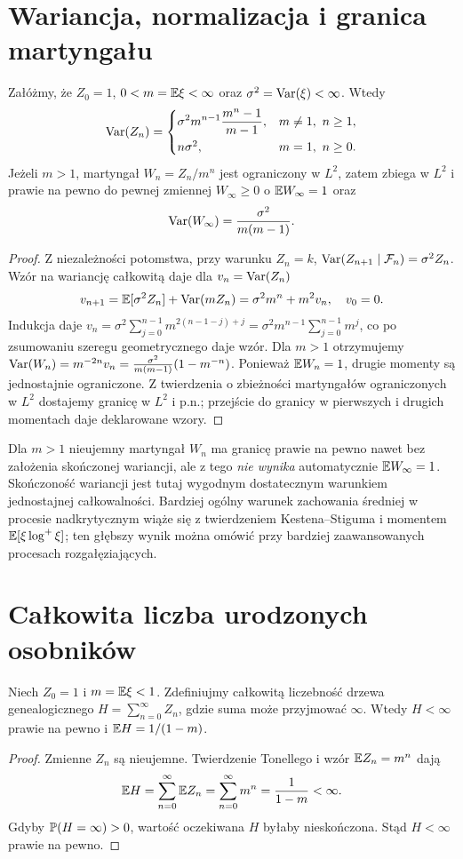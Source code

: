 \section{Wariancja, normalizacja i granica martyngału}
\begin{twierdzenie}
Załóżmy, że $Z_0=1$, $0<m=\mathbb{E}\xi<\infty$ oraz
$\sigma^2=\operatorname{Var}(\xi)<\infty$. Wtedy
\[
\Var(Z_n)=
\begin{cases}
\displaystyle \sigma^2m^{n-1}\frac{m^n-1}{m-1},&m\ne1,\ n\ge1,\\[6pt]
 n\sigma^2,&m=1,\ n\ge0.
\end{cases}
\]
Jeżeli $m>1$, martyngał $W_n=Z_n/m^n$ jest ograniczony
w $L^2$, zatem zbiega w $L^2$ i prawie na pewno do
pewnej zmiennej $W_\infty\ge0$ o $\mathbb{E} W_\infty=1$ oraz
\[
\operatorname{Var}(W_\infty)=\frac{\sigma^2}{m(m-1)}.
\]
\end{twierdzenie}
\begin{proof}
Z niezależności potomstwa, przy warunku $Z_n=k$,
$\operatorname{Var}(Z_{n+1}\mid\mathcal{F}_n)=\sigma^2Z_n$.
Wzór na wariancję całkowitą daje dla $v_n=\operatorname{Var}(Z_n)$
\[
v_{n+1}=\mathbb{E}[\sigma^2Z_n]
+\operatorname{Var}(mZ_n)=\sigma^2m^n+m^2v_n,
\quad v_0=0.
\]
Indukcja daje
$v_n=\sigma^2\sum_{j=0}^{n-1}m^{2(n-1-j)+j}
=\sigma^2m^{n-1}\sum_{j=0}^{n-1}m^j$,
co po zsumowaniu szeregu geometrycznego daje wzór.
Dla $m>1$ otrzymujemy
$\operatorname{Var}(W_n)=m^{-2n}v_n
=\frac{\sigma^2}{m(m-1)}(1-m^{-n})$.
Ponieważ $\mathbb{E} W_n=1$, drugie momenty są jednostajnie
ograniczone. Z twierdzenia o zbieżności martyngałów
ograniczonych w $L^2$ dostajemy granicę w $L^2$ i p.n.;
przejście do granicy w pierwszych i drugich momentach daje
deklarowane wzory.
\end{proof}

\begin{uwaga}
Dla $m>1$ nieujemny martyngał $W_n$ ma granicę prawie na pewno
nawet bez założenia skończonej wariancji, ale z tego
\emph{nie wynika} automatycznie $\mathbb{E} W_\infty=1$.
Skończoność wariancji jest tutaj wygodnym dostatecznym
warunkiem jednostajnej całkowalności. Bardziej ogólny
warunek zachowania średniej w procesie nadkrytycznym
wiąże się z twierdzeniem Kestena--Stiguma i momentem
$\mathbb{E}[\xi\log^+\xi]$; ten głębszy wynik można omówić
przy bardziej zaawansowanych procesach rozgałęziających.
\end{uwaga}

\section{Całkowita liczba urodzonych osobników}
\begin{twierdzenie}
Niech $Z_0=1$ i $m=\mathbb{E}\xi<1$.
Zdefiniujmy całkowitą liczebność drzewa genealogicznego
$H=\sum_{n=0}^\infty Z_n$, gdzie suma może przyjmować $\infty$.
Wtedy $H<\infty$ prawie na pewno i
$\mathbb{E} H=1/(1-m)$.
\end{twierdzenie}
\begin{proof}
Zmienne $Z_n$ są nieujemne. Twierdzenie Tonellego
i wzór $\mathbb{E} Z_n=m^n$ dają
\[
\mathbb{E} H=\sum_{n=0}^\infty\mathbb{E} Z_n=\sum_{n=0}^\infty m^n
=\frac{1}{1-m}<\infty.
\]
Gdyby $\mathbb{P}(H=\infty)>0$, wartość oczekiwana $H$
byłaby nieskończona. Stąd $H<\infty$ prawie na pewno.
\end{proof}

